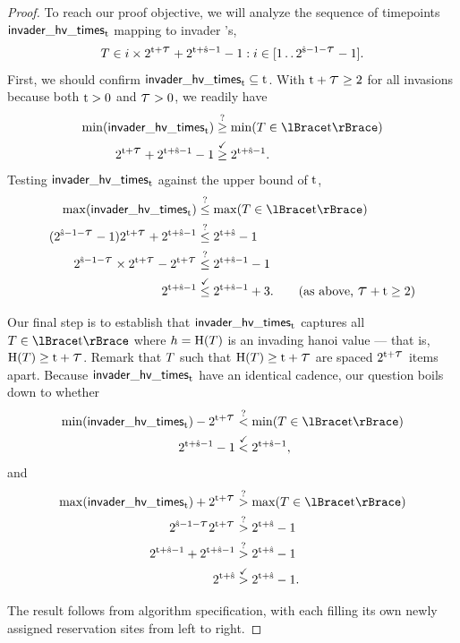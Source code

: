 \begin{proof}
To reach our proof objective, we will analyze the sequence of timepoints $\mathsf{invader\_hv\_times}_{\colort}$ mapping to invader \hv{}'s,
\begin{align*}
\colorT \in i \times 2^{\colort + \colortau} +
2^{\colort + \colors - 1} - 1
:
i \in [1 \twodots 2^{\colors - 1 - \colortau} - 1].
\end{align*}
First, we should confirm $\mathsf{invader\_hv\_times}_{\colort} \subseteq \colort$.
With $\colort + \colortau \geq 2$ for all invasions because both $\colort > 0$ and $\colortau > 0$, we readily have
\begin{align*}
\min(\mathsf{invader\_hv\_times}_{\colort})
&\stackrel{?}{\geq}
\min(\colorT \in \colortsetofT)\\
2^{\colort + \colortau} + 2^{\colort + \colors - 1} - 1
&\stackrel{\checkmark}{\geq}
2^{\colort + \colors - 1}.
\end{align*}
Testing $\mathsf{invader\_hv\_times}_{\colort}$ against the upper bound of $\colort$,
\begin{align*}
\max(\mathsf{invader\_hv\_times}_{\colort})
&\stackrel{?}{\leq}
\max(\colorT \in \colortsetofT)
\\
(2^{\colors - 1 - \colortau}  - 1)
2^{\colort + \colortau} + 2^{\colort + \colors - 1}
&\stackrel{?}{\leq}
2^{\colort + \colors} - 1
\\
2^{\colors - 1 - \colortau} \times 2^{\colort + \colortau} - 2^{\colort + \colortau}
&\stackrel{?}{\leq}
2^{\colort + \colors - 1} - 1
\\
2^{\colort + \colors - 1}
&\stackrel{\checkmark}{\leq}
2^{\colort + \colors - 1} + 3.
\tag{as above, $\colortau + \colort \geq 2$}
\end{align*}

Our final step is to establish that $\mathsf{invader\_hv\_times}_{\colort}$ captures all $\colorT \in \colortsetofT$ where $\colorh = \colorH(\colorT)$ is an invading hanoi value --- that is, $\colorH(\colorT) \geq \colort + \colortau$.
Remark that $\colorT$ such that $\colorH(\colorT) \geq \colort + \colortau$ are spaced $2^{\colort + \colortau}$ items apart.
Because $\mathsf{invader\_hv\_times}_{\colort}$ have an identical cadence, our question boils down to whether
\begin{align*}
\min(\mathsf{invader\_hv\_times}_{\colort})
- 2^{\colort + \colortau}
&\stackrel{?}{<}
\min(\colorT \in \colortsetofT)\\
2^{\colort + \colors - 1} - 1
&\stackrel{\checkmark}{<}
2^{\colort + \colors - 1},
\end{align*}
and
\begin{align*}
\max(\mathsf{invader\_hv\_times}_{\colort})
+ 2^{\colort + \colortau}
&\stackrel{?}{>}
\max(\colorT \in \colortsetofT)\\
2^{\colors - 1 - \colortau} 2^{\colort + \colortau}
&\stackrel{?}{>}
2^{\colort + \colors} - 1\\
2^{\colort + \colors - 1}
+ 2^{\colort + \colors - 1}
&\stackrel{?}{>}
2^{\colort + \colors} - 1\\
2^{\colort + \colors}
&\stackrel{\checkmark}{>}
2^{\colort + \colors} - 1.
\end{align*}

The result follows from algorithm specification, with each \hv{} filling its own newly assigned reservation sites from left to right.
\end{proof}
